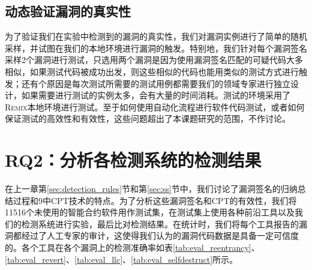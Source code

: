 \subsection{动态验证漏洞的真实性}

为了验证我们在实验中检测到的漏洞的真实性，我们对漏洞实例进行了简单的随机采样，并试图在我们的本地环境进行漏洞的触发。特别地，我们针对每个漏洞签名采样2个漏洞进行测试，只选用两个漏洞是因为使用漏洞签名匹配的可疑代码大多相似，如果测试代码被成功出发，则这些相似的代码也能用类似的测试方式进行触发；还有个原因是每次测试所需要的测试用例都需要我们的领域专家进行独立设计，如果需要进行测试的实例太多，会有大量的时间消耗。测试的环境采用了\textsc{Remix}本地环境进行测试。至于如何使用自动化流程进行软件代码测试，或者如何保证测试的高效性和有效性，这些问题超出了本课题研究的范围，不作讨论。

\section{RQ2：分析各检测系统的检测结果}

在上一章第\ref{sec:detection_rules}节和第\ref{sec:ss}节中，我们讨论了漏洞签名的归纳总结过程和9中CPT技术的特点。为了分析这些漏洞签名和CPT的有效性，我们将11516个未使用的智能合约软件用作测试集，在测试集上使用各种前沿工具以及我们的检测系统进行实验，最后比对检测结果。在统计时，我们将每个工具报告的漏洞都经过了人工专家的审计，这使得我们认为的漏洞代码数据是具备一定可信度的。各个工具在各个漏洞上的检测准确率如表\ref{tab:eval_reentrancy}、\ref{tab:eval_revert}、\ref{tab:eval_llc}、\ref{tab:eval_selfdestruct}所示。

